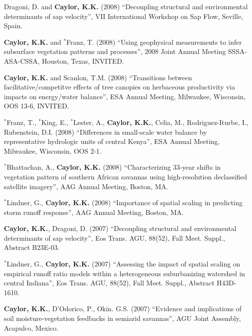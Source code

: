 \documentclass[10pt]{report}
\begin{document}
\begin{etaremune}
\item Dragoni, D. and \textbf{Caylor, K.K.} (2008) ``Decoupling structural and environmental determinants of sap velocity'', VII International Workshop on Sap Flow, Seville, Spain.

\item \textbf{Caylor, K.K.} and $^{*}$Franz, T. (2008) ``Using geophysical measurements to infer subsurface vegetation patterns and processes'', 2008 Joint Annual Meeting SSSA-ASA-CSSA, Houston, Texas, INVITED.

\item \textbf{Caylor, K.K.} and Scanlon, T.M. (2008) ``Transitions between facilitative/competitve effects of tree canopies on herbaceous productivity via impacts on energy/water balance'', ESA Annual Meeting, Milwaukee, Wisconsin, OOS 13-6, INVITED.

\item $^{*}$Franz, T., $^{*}$King, E., $^{*}$Lester, A., \textbf{Caylor, K.K.}, Celia, M., Rodriguez-Iturbe, I., Rubenstein, D.I. (2008) ``Differences in small-scale water balance by representative hydrologic units of central Kenya'', ESA Annual Meeting, Milwaukee, Wisconsin, OOS 2-1.

\item $^{*}$Bhattachan, A., \textbf{Caylor, K.K.} (2008) ``Characterizing 33-year shifts in vegetation pattern of southern African savannas using high-resolution declassified satellite imagery'', AAG Annual Meeting, Boston, MA. 

\item $^{*}$Lindner, G., \textbf{Caylor, K.K.} (2008) ``Importance of spatial scaling in predicting storm runoff response'', AAG Annual Meeting, Boston, MA.

\item \textbf{Caylor, K.K.}, Dragoni, D. (2007) ``Decoupling structural and environmental determinants of sap velocity'', Eos Trans. AGU, 88(52), Fall Meet. Suppl., Abstract B23E-03.

\item $^{*}$Lindner, G., \textbf{Caylor, K.K.} (2007) ``Assessing the impact of spatial scaling on empirical runoff ratio models within a heterogeneous suburbanizing watershed in central Indiana'', Eos Trans. AGU, 88(52), Fall Meet. Suppl., Abstract H43D-1610.

\item \textbf{Caylor, K.K.}, D'Odorico, P., Okin. G.S. (2007) ``Evidence and implications of soil moisture-vegetation feedbacks in semiarid savannas'', AGU Joint Assembly, Acapulco, Mexico.


\end{etaremune}
\end{document}
